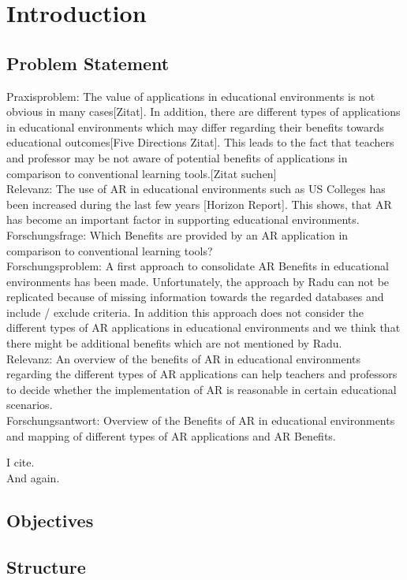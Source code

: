 \section{Introduction}
\subsection{Problem Statement}
Praxisproblem: The value of \AR applications in educational environments is not obvious in many cases[Zitat]. In addition, there are different types of \AR applications in educational environments which may differ regarding their benefits towards educational outcomes[Five Directions Zitat]. This leads to the fact that teachers and professor may be not aware of potential benefits of \AR applications in comparison to conventional learning tools.[Zitat suchen]\\
Relevanz: The use of AR in educational environments such as US Colleges has been increased during the last few years [Horizon Report]. This shows, that AR has become an important factor in supporting educational environments.\\
Forschungsfrage: Which Benefits are provided by an AR application in comparison to conventional learning tools? \\
Forschungsproblem: A first approach to consolidate AR Benefits in educational environments has been made. Unfortunately, the approach by Radu can not be replicated because of missing information towards the regarded databases and include / exclude criteria. In addition this approach does not consider the different types of AR applications in educational environments and we think that there might be additional benefits which are not mentioned by Radu.\\
Relevanz: An overview of the benefits of AR in educational environments regarding the different types of AR applications can help teachers and professors to decide whether the implementation of AR is reasonable in certain educational scenarios.\\
Forschungsantwort: Overview of the Benefits of AR in educational environments and mapping of different types of AR applications and AR Benefits.

I cite.\autocite[cf.][149]{Chang.2014}\\
And again.\autocite[4-5]{Dunser.2012}
\subsection{Objectives}
\subsection{Structure}